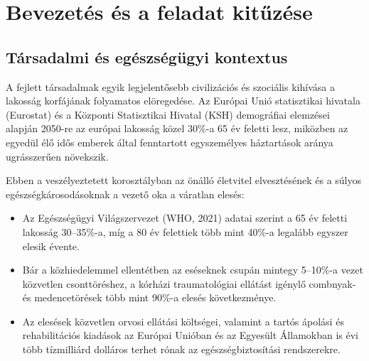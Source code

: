 \documentclass[12pt,a4paper,oneside]{report}
\begin{document}
\tableofcontents

\chapter{Bevezetés és a feladat kitűzése}

\section{Társadalmi és egészségügyi kontextus}
A fejlett társadalmak egyik legjelentősebb civilizációs és szociális kihívása a lakosság korfájának folyamatos elöregedése. Az Európai Unió statisztikai hivatala (Eurostat) és a Központi Statisztikai Hivatal (KSH) demográfiai elemzései alapján 2050-re az európai lakosság közel 30\%-a 65 év feletti lesz, miközben az egyedül élő idős emberek által fenntartott egyszemélyes háztartások aránya ugrásszerűen növekszik. 

Ebben a veszélyeztetett korosztályban az önálló életvitel elvesztésének és a súlyos egészségkárosodásoknak a vezető oka a váratlan elesés:
\begin{itemize}
    \item Az Egészségügyi Világszervezet (WHO, 2021) \cite{who2021} adatai szerint a 65 év feletti lakosság 30--35\%-a, míg a 80 év felettiek több mint 40\%-a legalább egyszer elesik évente.
    \item Bár a közhiedelemmel ellentétben az eséseknek csupán mintegy 5--10\%-a vezet közvetlen csonttöréshez, a kórházi traumatológiai ellátást igénylő combnyak- és medencetörések több mint 90\%-a elesés következménye.
    \item Az elesések közvetlen orvosi ellátási költségei, valamint a tartós ápolási és rehabilitációs kiadások az Európai Unióban és az Egyesült Államokban is évi több tízmilliárd dolláros terhet rónak az egészségbiztosítási rendszerekre.
\end{itemize}
\end{document}
